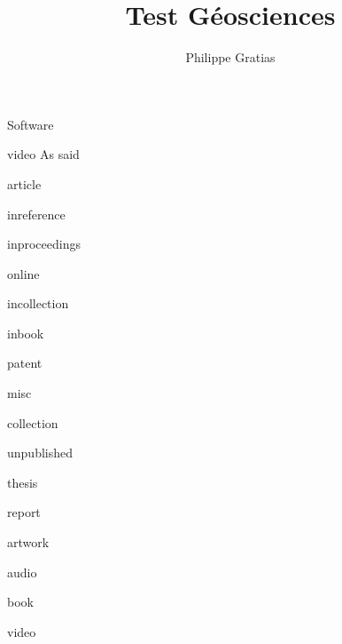 \documentclass[11pt, oneside]{article}   	%
\title{Test Géosciences}
\author{Philippe Gratias}
\begin{document}
\maketitle

\cite{gross_communicating_2002}
Software \cite{noauthor_hpc-mathssamurai_cras_2021_2021, grootveld_fair_2018}

video As \textcite{grootveld_fair_2018} said

\cite{noauthor_peculiar_1665}

\cite{acharya_2019_2019}

article \cite{cunningham_extraordinary_1957}

inreference \cite{noauthor_initiative_2018}

inproceedings \cite{aksnes_criteria-based_2018}

online \cite{bruck_recognition_2016}

incollection \cite{recknagel_preserve_2018}

inbook \cite{sternberg_writing_2000}

patent \cite{goldman_position_2023}

misc \cite{elser_empairex_2019}

collection \cite{bartling_opening_2014}

unpublished \cite{von_arlitsch_driving_2017}

thesis \cite{bizos_big_2020} \cite{blanchard_retrospective_2022}

report \cite{noauthor_aligning_2022}

artwork \cite{richard_photographs_2016}

audio \cite{ghys_whats_nodate}

book \cite{balibar_life_2017}

video \cite{bechgaard_electrocrystallisation_2023}

\cite{brahe_astronomiae_1602}

\printbibliography
\end{document}
